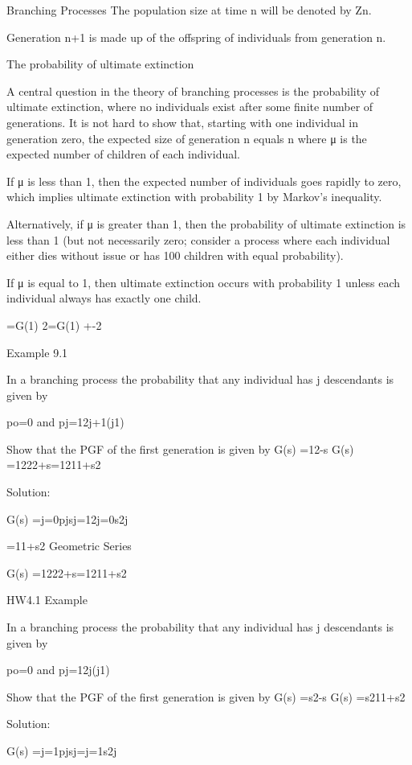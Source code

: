 Branching Processes
The population size at time n will be denoted by Zn.
 
Generation n+1 is made up of the offspring of individuals from generation n.
 
 
The probability of ultimate extinction
 
A central question in the theory of branching processes is the probability of ultimate extinction, where no individuals exist after some finite number of generations. It is not hard to show that, starting with one individual in generation zero, the expected size of generation n equals n where μ is the expected number of children of each individual.
 
If μ is less than 1, then the expected number of individuals goes rapidly to zero, which implies ultimate extinction with probability 1 by Markov's inequality.
 
Alternatively, if μ is greater than 1, then the probability of ultimate extinction is less than 1 (but not necessarily zero; consider a process where each individual either dies without issue or has 100 children with equal probability).
 
If μ is equal to 1, then ultimate extinction occurs with probability 1 unless each individual always has exactly one child.
 

=G(1)
2=G(1) +-2




Example 9.1
 
In a branching process the probability that any individual has j descendants is given by
 
po=0   and  pj=12j+1(j1)


Show that the PGF of the first generation is given by G(s) =12-s
 G(s) =1222+s=1211+s2

Solution:

G(s) =j=0pjsj=12j=0s2j

	   =11+s2	     Geometric Series


G(s) =1222+s=1211+s2
 


HW4.1 Example
 
In a branching process the probability that any individual has j descendants is given by
 
po=0   and  pj=12j(j1)


Show that the PGF of the first generation is given by G(s) =s2-s
 G(s) =s211+s2

Solution:

G(s) =j=1pjsj=j=1s2j

